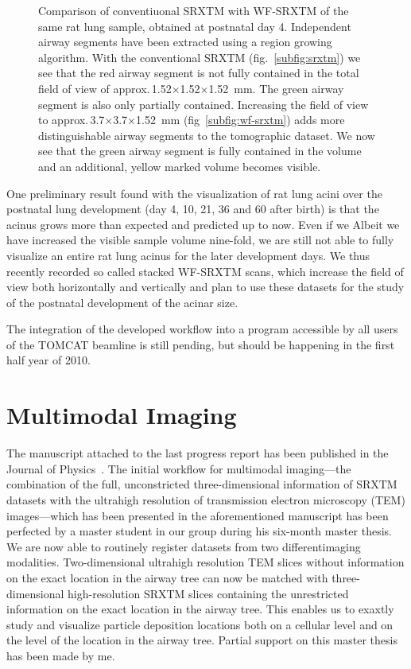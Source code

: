 \documentclass[a4paper,twoside,english,DIV=calc]{scrartcl}
\newlength\imagescale
\begin{document}
\begin{figure}[htp]
{%
		\label{subfig:wf-srxtm}%
		}%
	\label{fig:srxtm_vs_wfsrxtm}%
	\caption{Comparison of conventiuonal SRXTM with WF-SRXTM of the same rat lung sample, obtained at postnatal day 4. Independent airway segments have been extracted using a region growing algorithm. With the conventional SRXTM (fig.~\ref{subfig:srxtm}) we see that the red airway segment is not fully contained in the total field of view of approx.\,1.52$\times$1.52$\times$\SI{1.52}{\milli\meter}. The green airway segment is also only partially contained. Increasing the field of view to approx.\,3.7$\times$3.7$\times$\SI{1.52}{\milli\meter}  %
(fig~\ref{subfig:wf-srxtm}) adds more distinguishable airway segments to the tomographic dataset. We now see that the green airway segment is fully contained in the volume and an additional, yellow marked volume becomes visible.
}%
\end{figure}

One preliminary result found with the visualization of rat lung acini over the postnatal lung development (day 4, 10, 21, 36 and 60 after birth) is that the acinus grows more than expected and predicted up to now. Even if we Albeit we have increased the visible sample volume nine-fold, we are still not able to fully visualize an entire rat lung acinus for the later development days. We thus recently recorded so called stacked WF-SRXTM scans, which increase the field of view both horizontally and vertically and plan to use these datasets for the study of the postnatal development of the acinar size.

The integration of the developed workflow into a program accessible by all users of the TOMCAT beamline is still pending, but should be happening in the first half year of 2010. 

\section{Multimodal Imaging}
The manuscript attached to the last progress report has been published in the Journal of Physics~\cite{Haberthuer2009}. The initial workflow for multimodal imaging---the combination of the full, unconstricted three-dimensional information of SRXTM datasets with the ultrahigh resolution of transmission electron microscopy (TEM) images---which has been presented in the aforementioned manuscript has been perfected by a master student in our group during his six-month master thesis. We are now able to routinely register datasets from two differentimaging modalities. Two-dimensional ultrahigh resolution TEM slices without information on the exact location in the airway tree can now be matched with three-dimensional high-resolution SRXTM slices containing the unrestricted information on the exact location in the airway tree. This enables us to exaxtly study and visualize particle deposition locations both on a cellular level and on the level of the location in the airway tree. Partial support on this master thesis has been made by me.
\end{document}
